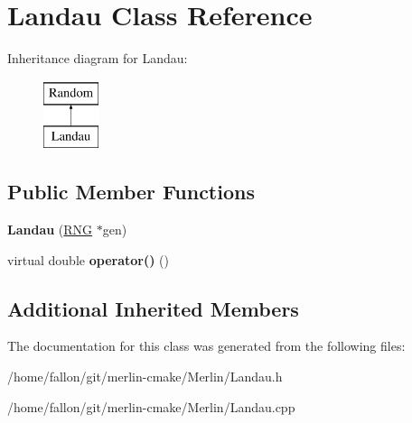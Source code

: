 \hypertarget{classLandau}{}\section{Landau Class Reference}
\label{classLandau}
Inheritance diagram for Landau\+:\begin{figure}[H]
\begin{center}
\leavevmode
\includegraphics[height=2.000000cm]{classLandau}
\end{center}
\end{figure}
\subsection*{Public Member Functions}
\begin{DoxyCompactItemize}
\item 
\mbox{\label{classLandau_a7b13cc264bc16a801ba8de983c2e98d0}} 
{\bfseries Landau} (\hyperlink{classRNG}{R\+NG} $\ast$gen)
\item 
\mbox{\label{classLandau_a48705f9d5e8161bb52c32f97ee287d52}} 
virtual double {\bfseries operator()} ()
\end{DoxyCompactItemize}
\subsection*{Additional Inherited Members}


The documentation for this class was generated from the following files\+:\begin{DoxyCompactItemize}
\item 
/home/fallon/git/merlin-\/cmake/\+Merlin/Landau.\+h\item 
/home/fallon/git/merlin-\/cmake/\+Merlin/Landau.\+cpp\end{DoxyCompactItemize}
